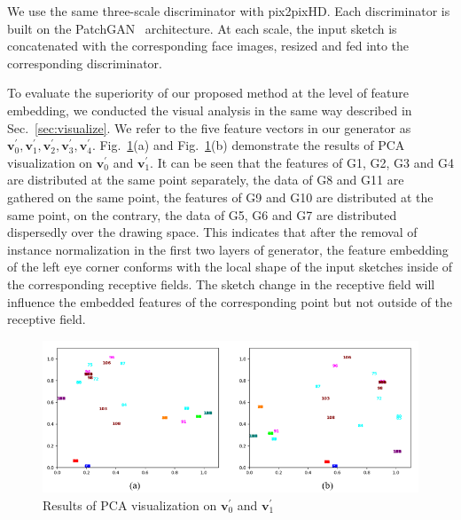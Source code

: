 \documentclass[10pt,twocolumn,letterpaper]{article}
\begin{document}
We use the same three-scale discriminator with pix2pixHD. 
Each discriminator is built on the PatchGAN~\cite{pix2pix} architecture. 
At each scale, the input sketch is concatenated with the corresponding face images, resized and fed into the corresponding discriminator.
 
 
To evaluate the superiority of our proposed method at the level of feature embedding, we conducted the visual analysis in the same way described in Sec.~\ref{sec:visualize}.
%
We refer to the five feature vectors in our generator as $\boldsymbol{v}_0^{'},\boldsymbol{v}_1^{'},\boldsymbol{v}_2^{'},\boldsymbol{v}_3^{'},\boldsymbol{v}_4^{'}$.
%
Fig.~\ref{fig:pca_1}(a) and Fig.~\ref{fig:pca_1}(b) demonstrate the results of PCA visualization on $\boldsymbol{v}_0^{'}$ and $\boldsymbol{v}_1^{'}$. 
It can be seen that the features of G1, G2, G3 and G4 are distributed at the same point separately, the data of G8 and G11 are gathered on the same point, the features of G9 and G10 are distributed at the same point, on the contrary, the data of G5, G6 and G7 are distributed dispersedly over the drawing space. 
This indicates that after the removal of instance normalization in the first two layers of generator, the feature embedding of the left eye corner conforms with the local shape of the input sketches inside of the corresponding receptive fields. The sketch change in the receptive field will influence the embedded features of the corresponding point but not outside of the receptive field.

\begin{figure}[htb]
	\centering
	\includegraphics[width=0.47 \textwidth]{pca_1.png}
	\caption{Results of PCA visualization on $\boldsymbol{v}_0^{'}$ and $\boldsymbol{v}_1^{'}$}
	\label{fig:pca_1}
\end{figure}
\end{document}
